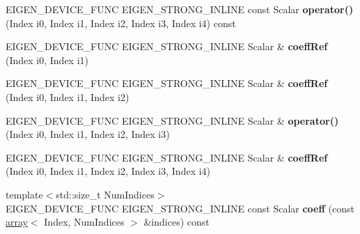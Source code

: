 \begin{DoxyCompactItemize}
\item 
\mbox{\label{class_eigen_1_1_tensor_ref_a3bc931c7bac0c4d57c4aa16003cc612b}} 
E\+I\+G\+E\+N\+\_\+\+D\+E\+V\+I\+C\+E\+\_\+\+F\+U\+NC E\+I\+G\+E\+N\+\_\+\+S\+T\+R\+O\+N\+G\+\_\+\+I\+N\+L\+I\+NE const Scalar {\bfseries operator()} (Index i0, Index i1, Index i2, Index i3, Index i4) const
\item 
\mbox{\label{class_eigen_1_1_tensor_ref_ac2a1483a4965b0021484d4df8811af5a}} 
E\+I\+G\+E\+N\+\_\+\+D\+E\+V\+I\+C\+E\+\_\+\+F\+U\+NC E\+I\+G\+E\+N\+\_\+\+S\+T\+R\+O\+N\+G\+\_\+\+I\+N\+L\+I\+NE Scalar \& {\bfseries coeff\+Ref} (Index i0, Index i1)
\item 
\mbox{\label{class_eigen_1_1_tensor_ref_abe81fca60dc0a1db6fc05ad1486185ed}} 
E\+I\+G\+E\+N\+\_\+\+D\+E\+V\+I\+C\+E\+\_\+\+F\+U\+NC E\+I\+G\+E\+N\+\_\+\+S\+T\+R\+O\+N\+G\+\_\+\+I\+N\+L\+I\+NE Scalar \& {\bfseries coeff\+Ref} (Index i0, Index i1, Index i2)
\item 
\mbox{\label{class_eigen_1_1_tensor_ref_ab596bb0753922df7f4753277388d361e}} 
E\+I\+G\+E\+N\+\_\+\+D\+E\+V\+I\+C\+E\+\_\+\+F\+U\+NC E\+I\+G\+E\+N\+\_\+\+S\+T\+R\+O\+N\+G\+\_\+\+I\+N\+L\+I\+NE Scalar \& {\bfseries operator()} (Index i0, Index i1, Index i2, Index i3)
\item 
\mbox{\label{class_eigen_1_1_tensor_ref_a06c558b2cfb6a9d4795a71d9d4ef6968}} 
E\+I\+G\+E\+N\+\_\+\+D\+E\+V\+I\+C\+E\+\_\+\+F\+U\+NC E\+I\+G\+E\+N\+\_\+\+S\+T\+R\+O\+N\+G\+\_\+\+I\+N\+L\+I\+NE Scalar \& {\bfseries coeff\+Ref} (Index i0, Index i1, Index i2, Index i3, Index i4)
\item 
\mbox{\label{class_eigen_1_1_tensor_ref_a42cc669aea64fb4d84b689abd9686524}} 
{\footnotesize template$<$std\+::size\+\_\+t Num\+Indices$>$ }\\E\+I\+G\+E\+N\+\_\+\+D\+E\+V\+I\+C\+E\+\_\+\+F\+U\+NC E\+I\+G\+E\+N\+\_\+\+S\+T\+R\+O\+N\+G\+\_\+\+I\+N\+L\+I\+NE const Scalar {\bfseries coeff} (const \hyperlink{class_eigen_1_1array}{array}$<$ Index, Num\+Indices $>$ \&indices) const
\item 
\mbox{\label{class_eigen_1_1_tensor_ref_a57a515b812336de074aaf6ad7b94b08b}} 

\end{DoxyCompactItemize}
